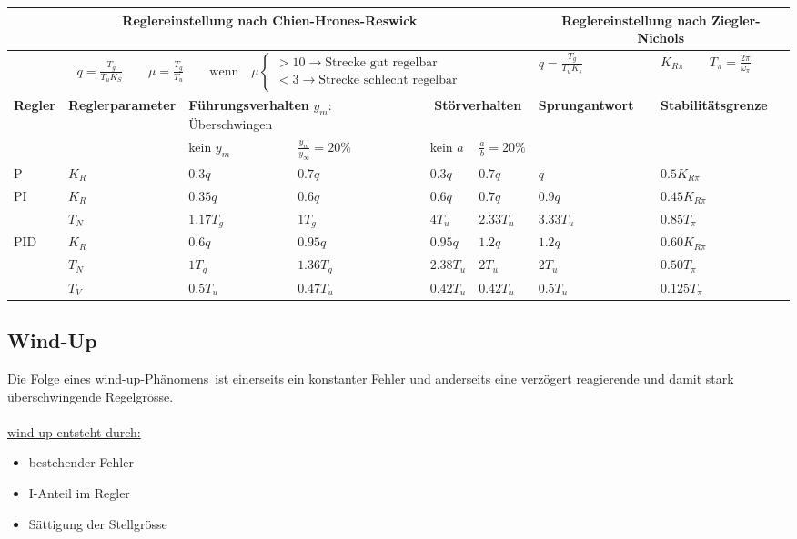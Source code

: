 	\begin{tabular}{|l|p{1.8cm}|l|l|l|l||l|l|}
	    \hline
	    \multicolumn{6}{|c||}{
	      \textbf{Reglereinstellung nach Chien-Hrones-Reswick}
	    } &
	    \multicolumn{2}{|c|}{
	      \textbf{Reglereinstellung nach Ziegler-Nichols}
	    }
		\\ \hline
		\multicolumn{6}{|c||}{
		  $
		  q = \frac{T_g}{T_uK_S} \qquad \mu = \frac{T_g}{T_u}
		  \qquad \text{wenn} \quad \mu
		  \begin{cases}
		    > 10 \rightarrow \text{Strecke gut regelbar} \\
		    < 3 \rightarrow \text{Strecke schlecht regelbar}
		  \end{cases}
		  $
		} & $q=\frac{T_g}{T_uK_s}$ & $K_{R\pi} \qquad T_\pi=\frac{2\pi}{\omega_\pi}$
		\\ \hline
		\textbf{Regler} & \textbf{Regler\-parameter} &
		\multicolumn{2}{|p{3.5cm}|}{\textbf{Führungsverhalten} \newline $y_m$:
		Überschwingen} &
		\multicolumn{2}{|c||}{\textbf{Störverhalten}} &
		\textbf{Sprungantwort} & \textbf{Stabilitätsgrenze}
		\\ \hline
		& & kein $y_m$ & $\frac{y_m}{y_\infty} = 20 \%$ & kein $a$ & $\frac{a}{b}= 20 \%$ & &
		\\ \hline
		P 	& $K_R$ 	& $0.3q$ 	& $0.7q$ 	& $0.3q$ 	& $0.7q$	& $q$ 	& $0.5K_{R\pi}$
		\\ \hline
		PI	& $K_R$		& $0.35q$	& $0.6q$	& $0.6q$	& $0.7q$	& $0.9q$ 	& $0.45K_{R\pi}$
		\\
		    & $T_N$		& $1.17T_g$	& $1T_g$	& $4T_u$	& $2.33T_u$ & $3.33T_u$ &
		    $0.85T_{\pi}$ \\ \hline
		PID & $K_R$		& $0.6q$	& $0.95q$	& $0.95q$	& $1.2q$ 	& $1.2q$ 	& $0.60K_{R\pi}$
		\\
			& $T_N$		& $1T_g$	& $1.36T_g$	& $2.38T_u$	& $2T_u$ 	& $2T_u$	& $0.50T_\pi$
		\\
			& $T_V$		& $0.5T_u$	& $0.47T_u$	& $0.42T_u$	& $0.42T_u$ & $0.5T_u$ 	& $0.125T_\pi$
		\\ \hline
	\end{tabular}


	\subsection{Wind-Up }
		Die Folge eines \glqq wind-up-Phänomens\grqq\ ist einerseits ein konstanter
		Fehler und anderseits eine verzögert reagierende und damit stark überschwingende
		Regelgrösse.\\ \\
		\underline{wind-up entsteht durch:}
		\begin{itemize}
			\item bestehender Fehler
			\item I-Anteil im Regler
			\item Sättigung der Stellgrösse
		\end{itemize}

